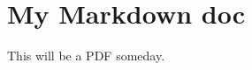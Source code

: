 \documentclass[
]{article}
\author{}
\date{}
\begin{document}
\section{My Markdown doc}\label{my-markdown-doc}

This will be a PDF someday.
\end{document}
